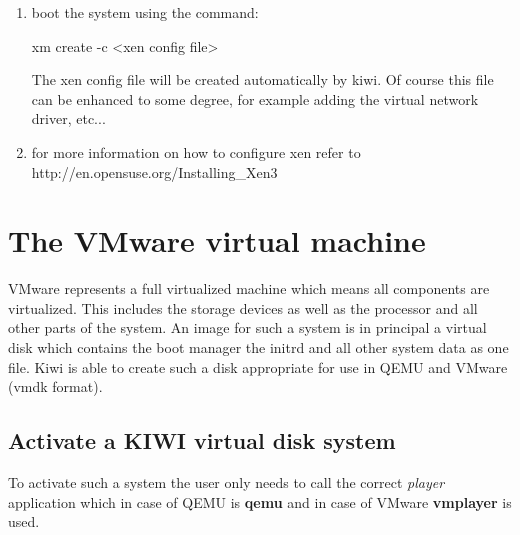 \begin{enumerate}
	\item boot the system using the command:

          \begin{Command}{9cm}
          xm create -c <xen config file>
          \end{Command}

          The xen config file will be created automatically by kiwi.
          Of course this file can be enhanced to some degree, for example
          adding the virtual network driver, etc...

    \item for more information on how to configure xen refer to\\
          http://en.opensuse.org/Installing\_Xen3
\end{enumerate}

\section{The VMware virtual machine}
VMware represents a full virtualized machine which means all components
are virtualized. This includes the storage devices as well as the
processor and all other parts of the system. An image for such a system
is in principal a virtual disk which contains the boot manager the
initrd and all other system data as one file. Kiwi is able to create
such a disk appropriate for use in QEMU and VMware (vmdk format).

\subsection{Activate a KIWI virtual disk system}
To activate such a system the user only needs to call the correct
\textit{player} application which in case of QEMU is \textbf{qemu} and
in case of VMware \textbf{vmplayer} is used.
